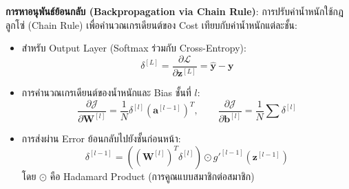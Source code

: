 \documentclass[12pt,a4paper]{article}
\begin{document}
\noindent
\textbf{การหาอนุพันธ์ย้อนกลับ (Backpropagation via Chain Rule)}:
การปรับค่าน้ำหนักใช้กฎลูกโซ่ (Chain Rule) เพื่อคำนวณเกรเดียนต์ของ Cost เทียบกับค่าน้ำหนักแต่ละชั้น:
\begin{itemize}[leftmargin=18pt, itemsep=2pt]
    \item สำหรับ Output Layer (Softmax ร่วมกับ Cross-Entropy):
    \begin{equation}
    \delta^{[L]} = \frac{\partial \mathcal{L}}{\partial \mathbf{z}^{[L]}} = \hat{\mathbf{y}} - \mathbf{y}
    \end{equation}
    \item การคำนวณเกรเดียนต์ของน้ำหนักและ Bias ชั้นที่ $l$:
    \begin{equation}
    \frac{\partial \mathcal{J}}{\partial \mathbf{W}^{[l]}} = \frac{1}{N} \delta^{[l]} (\mathbf{a}^{[l-1]})^T, \qquad \frac{\partial \mathcal{J}}{\partial \mathbf{b}^{[l]}} = \frac{1}{N} \sum \delta^{[l]}
    \end{equation}
    \item การส่งผ่าน Error ย้อนกลับไปยังชั้นก่อนหน้า:
    \begin{equation}
    \delta^{[l-1]} = \left( (\mathbf{W}^{[l]})^T \delta^{[l]} \right) \odot g'^{[l-1]}(\mathbf{z}^{[l-1]})
    \end{equation}
    โดย $\odot$ คือ Hadamard Product (การคูณแบบสมาชิกต่อสมาชิก)
\end{itemize}
\end{document}
